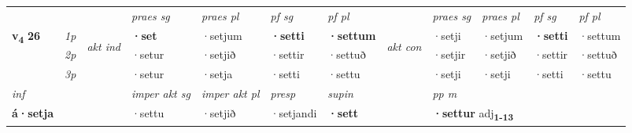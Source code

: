 \begin{longtable}[l]{X>{\footnotesize\itshape}llXXXXlXXXX}
 & &   & \textit{praes sg}  & \textit{praes pl}    & \textit{ pf sg} & \textit{pf pl} & & \textit{praes sg}  & \textit{praes pl}    & \textit{pf sg} & \textit{pf pl }  \\ \cmidrule{4-7} \cmidrule{9-12}
 \multirow{2}{*}{{{\textbf{v{\textsubscript{4}}} \Large{\textbf{26}}}}}  & 1p & \multirow{3}{*}{\begin{turn}{90}\textit{akt ind}\end{turn}} & \textbf{·set} & ·setjum & \textbf{·setti} & \textbf{·settum} & \multirow{3}{*}{\begin{turn}{90}\textit{akt con}\end{turn}} &·setji & ·setjum & \textbf{·setti} & ·settum\\*
 & 2p &  &  ·setur  & ·setjið & ·settir & ·settuð & & ·setjir & ·setjið & ·settir & ·settuð \\*
 & 3p &  & ·setur & ·setja & ·setti & ·settu & & ·setji & ·setji& ·setti & ·settu \\*
\cmidrule{4-7} \cmidrule{9-12}

   {\textit{inf}} & &  & \textit{imper akt sg} & \textit{imper akt pl}   & \textit{presp} & \textit{supin}  && \textit{pp m} \\*
  {\textbf{á\allowbreak ·setja}} & && ·settu  & ·setjið   & ·setjandi &  \textbf{·sett}  && \multicolumn{2}{l}{\textbf{·settur} adj\textbf{\textsubscript{1-13}}} \\*

\midrule


\end{longtable}
